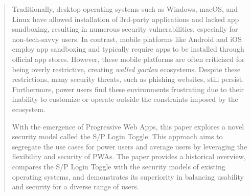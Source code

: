 \begin{abstract}

Traditionally, desktop operating systems such as Windows, macOS, and Linux have allowed installation of 3rd-party applications and lacked app sandboxing, resulting in numerous security vulnerabilities, especially for non-tech-savvy users. In contrast, mobile platforms like Android and iOS employ app sandboxing and typically require apps to be installed through official app stores. However, these mobile platforms are often criticized for being overly restrictive, creating \textit{walled garden} ecosystems. Despite these restrictions, many security threats, such as phishing websites, still persist. Furthermore, power users find these environments frustrating due to their inability to customize or operate outside the constraints imposed by the ecosystem.

With the emergence of Progressive Web Apps, this paper explores a novel security model called the S/P Login Toggle. This approach aims to segregate the use cases for power users and average users by leveraging the flexibility and security of PWAs. The paper provides a historical overview, compares the S/P Login Toggle with the security models of existing operating systems, and demonstrates its superiority in balancing usability and security for a diverse range of users.

\end{abstract}
